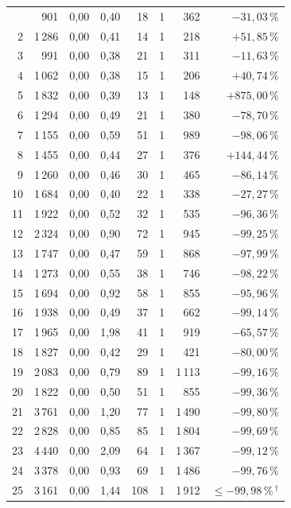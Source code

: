 \begin{longtable}{@{}r r r r r r r r@{}}
  \endlastfoot
  1 & 901 & 0{,}00 & 0{,}40 & 18 & 1 & 362 & $-31{,}03\,\%$ \\
  2 & 1\,286 & 0{,}00 & 0{,}41 & 14 & 1 & 218 & $+51{,}85\,\%$ \\
  3 & 991 & 0{,}00 & 0{,}38 & 21 & 1 & 311 & $-11{,}63\,\%$ \\
  4 & 1\,062 & 0{,}00 & 0{,}38 & 15 & 1 & 206 & $+40{,}74\,\%$ \\
  5 & 1\,832 & 0{,}00 & 0{,}39 & 13 & 1 & 148 & $+875{,}00\,\%$ \\
  6 & 1\,294 & 0{,}00 & 0{,}49 & 21 & 1 & 380 & $-78{,}70\,\%$ \\
  7 & 1\,155 & 0{,}00 & 0{,}59 & 51 & 1 & 989 & $-98{,}06\,\%$ \\
  8 & 1\,455 & 0{,}00 & 0{,}44 & 27 & 1 & 376 & $+144{,}44\,\%$ \\
  9 & 1\,260 & 0{,}00 & 0{,}46 & 30 & 1 & 465 & $-86{,}14\,\%$ \\
  10 & 1\,684 & 0{,}00 & 0{,}40 & 22 & 1 & 338 & $-27{,}27\,\%$ \\
  11 & 1\,922 & 0{,}00 & 0{,}52 & 32 & 1 & 535 & $-96{,}36\,\%$ \\
  12 & 2\,324 & 0{,}00 & 0{,}90 & 72 & 1 & 945 & $-99{,}25\,\%$ \\
  13 & 1\,747 & 0{,}00 & 0{,}47 & 59 & 1 & 868 & $-97{,}99\,\%$ \\
  14 & 1\,273 & 0{,}00 & 0{,}55 & 38 & 1 & 746 & $-98{,}22\,\%$ \\
  15 & 1\,694 & 0{,}00 & 0{,}92 & 58 & 1 & 855 & $-95{,}96\,\%$ \\
  16 & 1\,938 & 0{,}00 & 0{,}49 & 37 & 1 & 662 & $-99{,}14\,\%$ \\
  17 & 1\,965 & 0{,}00 & 1{,}98 & 41 & 1 & 919 & $-65{,}57\,\%$ \\
  18 & 1\,827 & 0{,}00 & 0{,}42 & 29 & 1 & 421 & $-80{,}00\,\%$ \\
  19 & 2\,083 & 0{,}00 & 0{,}79 & 89 & 1 & 1\,113 & $-99{,}16\,\%$ \\
  20 & 1\,822 & 0{,}00 & 0{,}50 & 51 & 1 & 855 & $-99{,}36\,\%$ \\
  21 & 3\,761 & 0{,}00 & 1{,}20 & 77 & 1 & 1\,490 & $-99{,}80\,\%$ \\
  22 & 2\,828 & 0{,}00 & 0{,}85 & 85 & 1 & 1\,804 & $-99{,}69\,\%$ \\
  23 & 4\,440 & 0{,}00 & 2{,}09 & 64 & 1 & 1\,367 & $-99{,}12\,\%$ \\
  24 & 3\,378 & 0{,}00 & 0{,}93 & 69 & 1 & 1\,486 & $-99{,}76\,\%$ \\
  25 & 3\,161 & 0{,}00 & 1{,}44 & 108 & 1 & 1\,912 & $\leq -99{,}98\,\%$\,$^{\dagger}$ \\

\end{longtable}
